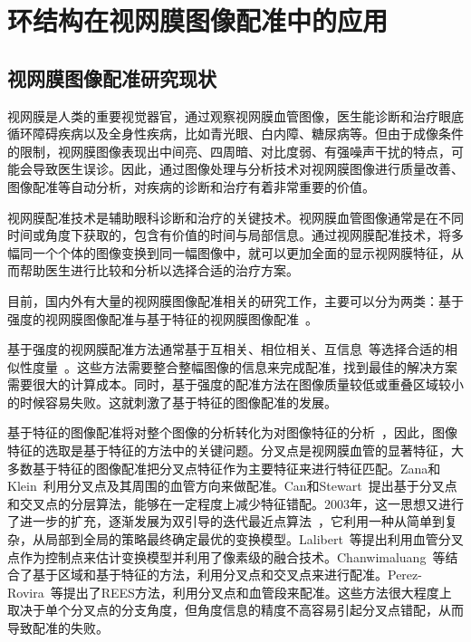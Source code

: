 

\chapter{环结构在视网膜图像配准中的应用}

\renewcommand\arraystretch{1}

\section{视网膜图像配准研究现状}
\label{cha:retinal}

视网膜是人类的重要视觉器官，通过观察视网膜血管图像，医生能诊断和治疗眼底循环障碍疾病以及全身性疾病，比如青光眼、白内障、糖尿病等。但由于成像条件的限制，视网膜图像表现出中间亮、四周暗、对比度弱、有强噪声干扰的特点，可能会导致医生误诊。因此，通过图像处理与分析技术对视网膜图像进行质量改善、图像配准等自动分析，对疾病的诊断和治疗有着非常重要的价值。

视网膜配准技术是辅助眼科诊断和治疗的关键技术。视网膜血管图像通常是在不同时间或角度下获取的，包含有价值的时间与局部信息。通过视网膜配准技术，将多幅同一个个体的图像变换到同一幅图像中，就可以更加全面的显示视网膜特征，从而帮助医生进行比较和分析以选择合适的治疗方案。

目前，国内外有大量的视网膜图像配准相关的研究工作，主要可以分为两类：基于强度的视网膜图像配准与基于特征的视网膜图像配准~\cite{oliveira2014medical}。

基于强度的视网膜配准方法通常基于互相关、相位相关、互信息~\cite{penney1998comparison}等选择合适的相似性度量~\cite{Glocker02,Nunes03,Dreo04}。这些方法需要整合整幅图像的信息来完成配准，找到最佳的解决方案需要很大的计算成本。同时，基于强度的配准方法在图像质量较低或重叠区域较小的时候容易失败。这就刺激了基于特征的图像配准的发展。

基于特征的图像配准将对整个图像的分析转化为对图像特征的分析~\cite{dingnan}，因此，图像特征的选取是基于特征的方法中的关键问题。分叉点是视网膜血管的显著特征，大多数基于特征的图像配准把分叉点特征作为主要特征来进行特征匹配。Zana和Klein~\cite{zana1999multimodal}利用分叉点及其周围的血管方向来做配准。Can和Stewart~\cite{can2002feature}提出基于分叉点和交叉点的分层算法，能够在一定程度上减少特征错配。2003年，这一思想又进行了进一步的扩充，逐渐发展为双引导的迭代最近点算法~\cite{stewart2003dual}，它利用一种从简单到复杂，从局部到全局的策略最终确定最优的变换模型。Lalibert~\cite{laliberte2003registration}等提出利用血管分叉点作为控制点来估计变换模型并利用了像素级的融合技术。Chanwimaluang~\cite{chanwimaluang2006hybrid}等结合了基于区域和基于特征的方法，利用分叉点和交叉点来进行配准。Perez-Rovira~\cite{perez2012rerbee}等提出了REES方法，利用分叉点和血管段来配准。这些方法很大程度上取决于单个分叉点的分支角度，但角度信息的精度不高容易引起分叉点错配，从而导致配准的失败。

